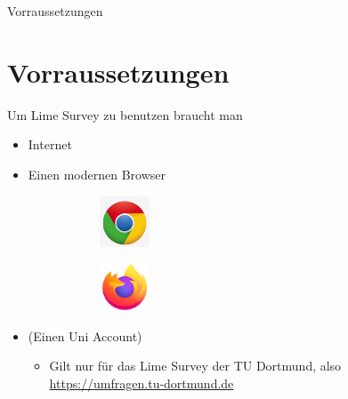 \documentclass[aspectratio=1610, 9pt]{beamer}
\begin{document}
\begin{frame}{Vorraussetzungen}
	\section{Vorraussetzungen}
	\label{sec:Vorraussetzungen}
	
	Um Lime Survey zu benutzen braucht man
  	\begin{itemize}
  	  \item Internet
	  \item Einen modernen Browser \cite{chrome-logo}\cite{firefox}
  	  \begin{figure}
  	        \centering
		\begin{subfigure}[b]{0.4\textwidth}
          		\centering
    			\includegraphics[width=1.5cm]{images/chrome.jpeg}
		\end{subfigure}
		\begin{subfigure}[b]{0.4\textwidth}
			\includegraphics[width=1.5cm]{images/firefox.png}
		\end{subfigure}
  	  \end{figure}
  	\item (Einen Uni Account)
		\begin{itemize}
			\item Gilt nur für das Lime Survey der TU Dortmund, also
				\url{https://umfragen.tu-dortmund.de}
		\end{itemize}
  	\end{itemize}
\end{frame}
\end{document}
